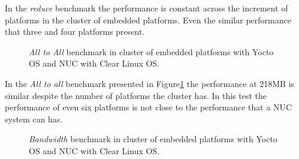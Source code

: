 In the \textit{reduce} benchmark the performance is constant across the
increment of platforms in the cluster of embedded platforms. Even the similar
performance that three and four platforms present.

\begin{figure}[H]
\begin{center}
\end{center}
\caption{\textit{All to All} benchmark in cluster of embedded platforms with Yocto OS and NUC
with Clear Linux OS.}
\label{all_to_all_cluster}
\end{figure}

In the \textit{All to all} benchmark presented in
Figure\ref{all_to_all_cluster} the performance at 218MB is similar despite the
number of platforms the cluster has. In this test the performance of even six
platforms is not close to the performance that a NUC \cite{NUC} system can has.

\begin{figure}[H]
\begin{center}
\end{center}
\caption{\textit{Bandwidth} benchmark in cluster of embedded platforms with Yocto OS and NUC
with Clear Linux OS.}
\label{bandwidth_cluster}
\end{figure}

